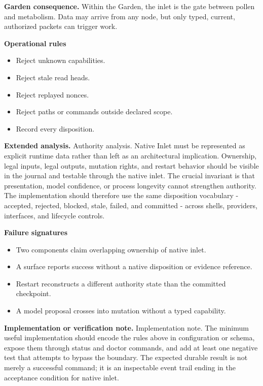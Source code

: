 \documentclass[10pt,letterpaper,oneside]{article}
\begin{document}
\textbf{Garden consequence.} Within the Garden, the inlet is the gate between pollen and metabolism. Data may arrive from any node, but only typed, current, authorized packets can trigger work.

\textbf{Operational rules}
\begin{itemize}
\item Reject unknown capabilities.
\item Reject stale read heads.
\item Reject replayed nonces.
\item Reject paths or commands outside declared scope.
\item Record every disposition.
\end{itemize}
\textbf{Extended analysis.} Authority analysis. Native Inlet must be represented as explicit runtime data rather than left as an architectural implication. Ownership, legal inputs, legal outputs, mutation rights, and restart behavior should be visible in the journal and testable through the native inlet. The crucial invariant is that presentation, model confidence, or process longevity cannot strengthen authority. The implementation should therefore use the same disposition vocabulary - accepted, rejected, blocked, stale, failed, and committed - across shells, providers, interfaces, and lifecycle controls.

\textbf{Failure signatures}
\begin{itemize}
\item Two components claim overlapping ownership of native inlet.
\item A surface reports success without a native disposition or evidence reference.
\item Restart reconstructs a different authority state than the committed checkpoint.
\item A model proposal crosses into mutation without a typed capability.
\end{itemize}
\textbf{Implementation or verification note.} Implementation note. The minimum useful implementation should encode the rules above in configuration or schema, expose them through status and doctor commands, and add at least one negative test that attempts to bypass the boundary. The expected durable result is not merely a successful command; it is an inspectable event trail ending in the acceptance condition for native inlet.
\end{document}
